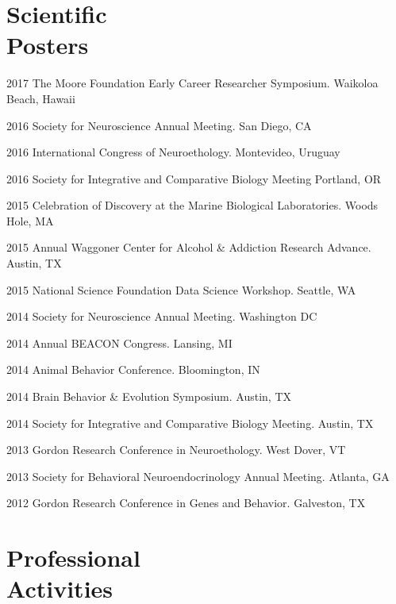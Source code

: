 \documentclass[margin,line]{resume}
\begin{document}
\begin{resume}

\section{\mysidestyle Scientific\\Posters}

\begin{list1}

\item[]2017	The Moore Foundation Early Career Researcher Symposium. Waikoloa Beach, Hawaii
\item[]2016	Society for Neuroscience Annual Meeting. San Diego, CA
\item[]2016	International Congress of Neuroethology. Montevideo, Uruguay
\item[]2016 Society for Integrative and Comparative Biology Meeting Portland, OR
\item[]2015	Celebration of Discovery at the Marine Biological Laboratories. Woods Hole, MA
\item[]2015	Annual Waggoner Center for Alcohol \& Addiction Research Advance. Austin, TX
\item[]2015	National Science Foundation Data Science Workshop. Seattle, WA
\item[]2014	Society for Neuroscience Annual Meeting. Washington DC
\item[]2014	Annual BEACON Congress. Lansing, MI
\item[]2014	Animal Behavior Conference. Bloomington, IN
\item[]2014	Brain Behavior \& Evolution Symposium. Austin, TX
\item[]2014	Society for Integrative and Comparative Biology Meeting. Austin, TX
\item[]2013	Gordon Research Conference in Neuroethology. West Dover, VT
\item[]2013	Society for Behavioral Neuroendocrinology Annual Meeting. Atlanta, GA
\item[]2012	Gordon Research Conference in Genes and Behavior. Galveston, TX

\end{list1}


    
\section{\mysidestyle Professional\\Activities}


\end{resume}
\end{document}
